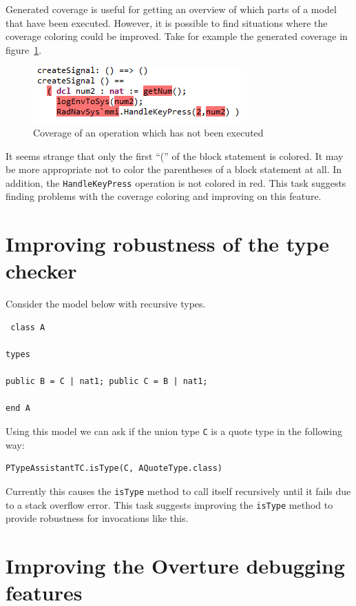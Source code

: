 \documentclass[11pt]{overturerep} \usepackage{t1enc,times,a4,t1enc}
\begin{document}
Generated coverage is useful for getting an overview of which parts of a model
that have been executed. However, it is possible to find situations where the
coverage coloring could be improved. Take for example the generated coverage in
figure~\ref{figure:Coverage}.

\begin{figure}[!ht] \centering \includegraphics{figures/coverage}
\caption{Coverage of an operation which has not been
executed}\label{figure:Coverage} \end{figure}

It seems strange that only the first ``('' of the block statement is colored.
It may be more appropriate not to color the parentheses of a block statement at
all. In addition, the \texttt{HandleKeyPress} operation is not colored in red.
This task suggests finding problems with the coverage coloring and improving on
this feature.

\section{Improving robustness of the type checker}

Consider the model below with recursive types.

\begin{lstlisting} class A
 
types
 
public B = C | nat1; public C = B | nat1; 
 
end A \end{lstlisting}

Using this model we can ask if the union type \texttt{C} is a quote type in the
following way:

\begin{lstlisting} 
PTypeAssistantTC.isType(C, AQuoteType.class)
\end{lstlisting}

Currently this causes the \texttt{isType} method to call itself recursively
until it fails due to a stack overflow error. This task suggests improving the
\texttt{isType} method to provide robustness for invocations like this.

\section{Improving the Overture debugging features}
\end{document}
